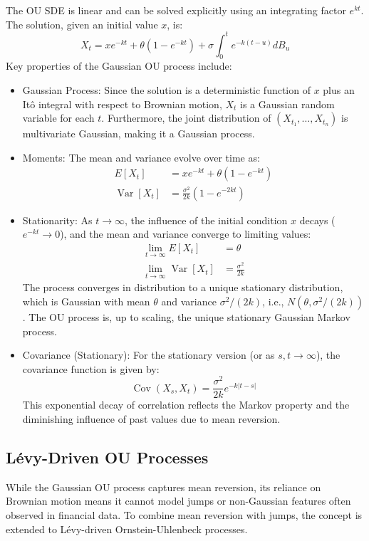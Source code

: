 \documentclass[11pt,twoside,openright]{report}
\begin{document}
The OU SDE is linear and can be solved explicitly using an integrating factor $e^{kt}$. The solution, given an initial value $x$, is:
\[ X_t = x e^{-kt} + \theta (1 - e^{-kt}) + \sigma \int_0^t e^{-k(t-u)} dB_u \]
Key properties of the Gaussian OU process include:
\begin{itemize}
    \item Gaussian Process: Since the solution is a deterministic function of $x$ plus an Itô integral with respect to Brownian motion, $X_t$ is a Gaussian random variable for each $t$. Furthermore, the joint distribution of $(X_{t_1}, \dots, X_{t_n})$ is multivariate Gaussian, making it a Gaussian process.
    \item Moments: The mean and variance evolve over time as:
    \begin{align*}
        E[X_t] &= x e^{-kt} + \theta (1 - e^{-kt}) \\
        \operatorname{Var}[X_t] &= \frac{\sigma^2}{2k} (1 - e^{-2kt})
    \end{align*}
    \item Stationarity: As $t \to \infty$, the influence of the initial condition $x$ decays ($e^{-kt} \to 0$), and the mean and variance converge to limiting values:
    \begin{align*}
        \lim_{t \to \infty} E[X_t] &= \theta \\
        \lim_{t \to \infty} \operatorname{Var}[X_t] &= \frac{\sigma^2}{2k}
    \end{align*}
    The process converges in distribution to a unique stationary distribution, which is Gaussian with mean $\theta$ and variance $\sigma^2 / (2k)$, i.e., $N(\theta, \sigma^2 / (2k))$. The OU process is, up to scaling, the unique stationary Gaussian Markov process.
    \item Covariance (Stationary): For the stationary version (or as $s, t \to \infty$), the covariance function is given by:
    \[ \operatorname{Cov}(X_s, X_t) = \frac{\sigma^2}{2k} e^{-k |t-s|} \]
    This exponential decay of correlation reflects the Markov property and the diminishing influence of past values due to mean reversion.
\end{itemize}

\subsection{Lévy-Driven OU Processes}
\label{subsec:levy_ou}

While the Gaussian OU process captures mean reversion, its reliance on Brownian motion means it cannot model jumps or non-Gaussian features often observed in financial data. To combine mean reversion with jumps, the concept is extended to Lévy-driven Ornstein-Uhlenbeck processes.
\end{document}
